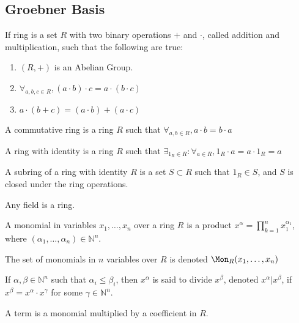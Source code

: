 \documentclass[crop=false,class=book]{standalone}
\begin{document}
\subsection{Groebner Basis}
\begin{definition}
If ring is a set $R$ with two binary operations $+$ and $\cdot$, called addition and multiplication, such that the following are true:
\begin{enumerate}
    \item $(R,+)$ is an Abelian Group.
    \item $\forall_{a,b,c\in R}, (a\cdot b)\cdot c = a\cdot(b\cdot c)$
    \item $a\cdot(b+c) = (a\cdot b)+(a\cdot c)$
\end{enumerate}
\end{definition}
\begin{definition}
A commutative ring is a ring $R$ such that $\forall_{a,b\in R}, a\cdot b=b\cdot a$
\end{definition}
\begin{definition}
A ring with identity is a ring $R$ such that $\exists_{1_{R}\in R}:\forall_{a\in R}, 1_{R}\cdot a=a\cdot 1_{R}=a$
\end{definition}
\begin{definition}
A subring of a ring with identity $R$ is a set $S\subset R$ such that $1_{R}\in S$, and $S$ is closed under the ring operations.
\end{definition}
\begin{remark}
Any field is a ring.
\end{remark}
\begin{definition}
A monomial in variables $x_1,\hdots, x_n$ over a ring $R$ is a product $x^\alpha = \prod_{k=1}^{n} x_1^{\alpha_1}$, where $(\alpha_1,\hdots, \alpha_n)\in \mathbb{N}^n$.
\end{definition}
\begin{notation}
The set of monomials in $n$ variables over $R$ is denoted $\Mon_{R}(x_1,\hdots, x_n)$
\end{notation}
\begin{definition}
If $\alpha,\beta \in \mathbb{N}^n$ such that $\alpha_i \leq \beta_i$, then $x^{\alpha}$ is said to divide $x^\beta$, denoted $x^\alpha \vert x^\beta$, if $x^\beta = x^\alpha \cdot x^\gamma$ for some $\gamma \in \mathbb{N}^n$.
\end{definition}
\begin{definition}
A term is a monomial multiplied by a coefficient in $R$.
\end{definition}
\end{document}
